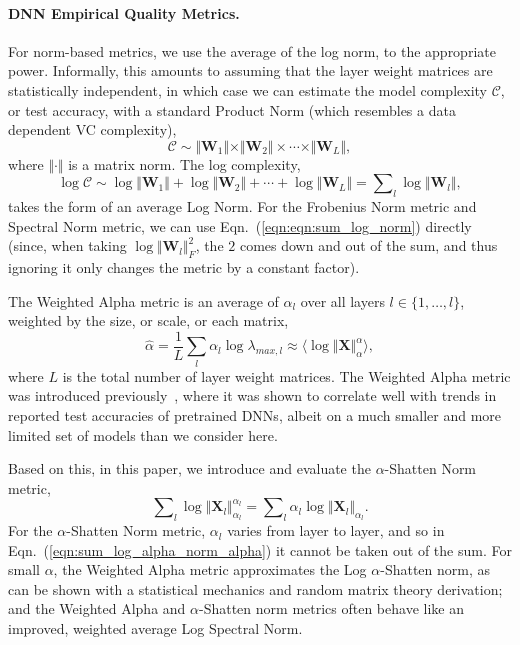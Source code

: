 \paragraph{DNN Empirical Quality Metrics.}

For norm-based metrics, we use the average of the log norm, to the appropriate power.
Informally, this amounts to assuming that the layer weight matrices are statistically independent, in which case we can estimate the model complexity $\mathcal{C}$, or test accuracy, with a standard Product Norm (which resembles a data dependent VC complexity),
\begin{equation}
\mathcal{C}\sim\Vert\mathbf{W}_{1}\Vert\times\Vert\mathbf{W}_{2}\Vert \times \cdots \times \Vert\mathbf{W}_{L}\Vert ,
\end{equation}
where $\Vert\cdot\Vert$ is a matrix norm.   
The log complexity,
\begin{equation}
\label{eqn:eqn:sum_log_norm}
\log\mathcal{C} \sim \log\Vert\mathbf{W}_{1}\Vert+\log\Vert\mathbf{W}_{2}\Vert + \cdots + \log\Vert\mathbf{W}_{L}\Vert = \sum\nolimits_l \log\Vert\mathbf{W}_{l}\Vert ,
\end{equation}
 takes the form of an average Log Norm.
For the Frobenius Norm metric and Spectral Norm metric, we can use Eqn.~(\ref{eqn:eqn:sum_log_norm}) directly (since, when taking $\log\Vert\mathbf{W}_{l}\Vert_{F}^{2}$, the $2$ comes down and out of the sum, and thus ignoring it only changes the metric by a constant factor).


The Weighted Alpha metric is an average of $\alpha_l$ over all layers $l \in \{1,\ldots,l\}$, weighted by the size, or scale, or each matrix,
\begin{equation}
\hat{\alpha} = \dfrac{1}{L}\sum_l \alpha_l\log\lambda_{max,l}\approx\langle\log\Vert\mathbf{X}\Vert_{\alpha}^{\alpha}\rangle    ,
\end{equation}
where $L$ is the total number of layer weight matrices.
The Weighted Alpha metric was introduced previously~\cite{MM20_SDM}, where it was shown to correlate well with trends in reported test accuracies of pretrained DNNs, albeit on a much smaller and more limited set of models than we consider here.

Based on this, in this paper, we introduce and evaluate the $\alpha$-Shatten Norm metric,
\begin{equation}
\label{eqn:sum_log_alpha_norm_alpha}
\sum\nolimits_l \log \Vert\mathbf{X}_l\Vert_{\alpha_l}^{\alpha_l} 
=
\sum\nolimits_l \alpha_l \log \Vert\mathbf{X}_l\Vert_{\alpha_l} .
\end{equation}
For the $\alpha$-Shatten Norm metric, $\alpha_l$ varies from layer to layer, and so in Eqn.~(\ref{eqn:sum_log_alpha_norm_alpha}) it cannot be taken out of the sum.
For small $\alpha$, the Weighted Alpha metric approximates the Log $\alpha$-Shatten norm, as can be shown with a statistical mechanics and random matrix theory derivation;
and the Weighted Alpha and $\alpha$-Shatten norm metrics often behave like an improved, weighted average Log Spectral Norm.

